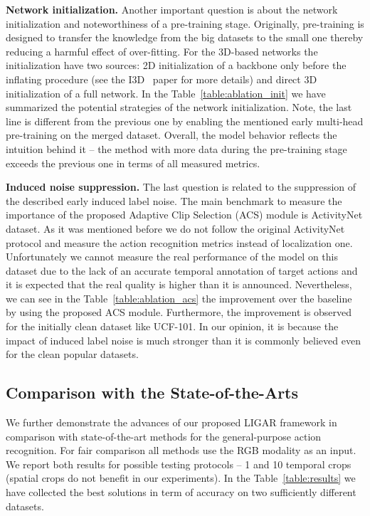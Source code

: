 \documentclass[twoside, twocolumn]{article}
\begin{document}
\textbf{Network initialization.} Another important question is about the network initialization and noteworthiness of a
pre-training stage. Originally, pre-training is designed to transfer the knowledge from the big datasets to the small
one thereby reducing a harmful effect of over-fitting. For the 3D-based networks the initialization have two sources: 2D
initialization of a backbone only before the inflating procedure (see the I3D~\cite{I3D} paper for more details) and
direct 3D initialization of a full network. In the Table~\ref{table:ablation_init} we have summarized the potential
strategies of the network initialization. Note, the last line is different from the previous one by enabling the
mentioned early multi-head pre-training on the merged dataset. Overall, the model behavior reflects the intuition
behind it -- the method with more data during the pre-training stage exceeds the previous one in terms of all measured
metrics.

\textbf{Induced noise suppression.} The last question is related to the suppression of the described early induced label
noise. The main benchmark to measure the importance of the proposed Adaptive Clip Selection (ACS) module is ActivityNet
dataset. As it was mentioned before we do not follow the original ActivityNet protocol and measure the action
recognition metrics instead of localization one. Unfortunately we cannot measure the real performance of the model on
this dataset due to the lack of an accurate temporal annotation of target actions and it is expected that the real
quality is higher than it is announced. Nevertheless, we can see in the Table~\ref{table:ablation_acs} the improvement
over the baseline by using the proposed ACS module. Furthermore, the improvement is observed for the initially clean
dataset like UCF-101. In our opinion, it is because the impact of induced label noise is much stronger than it is
commonly believed even for the clean popular datasets.

\subsection{Comparison with the State-of-the-Arts}

\lettrine[nindent=0em,lines=3]{W}{}e further demonstrate the advances of our proposed LIGAR framework in comparison with
state-of-the-art methods for the general-purpose action recognition. For fair comparison all methods use the RGB
modality as an input. We report both results for possible testing protocols -- 1 and 10 temporal crops (spatial crops do
not benefit in our experiments). In the Table~\ref{table:results} we have collected the best solutions in term of
accuracy on two sufficiently different datasets.
\end{document}
